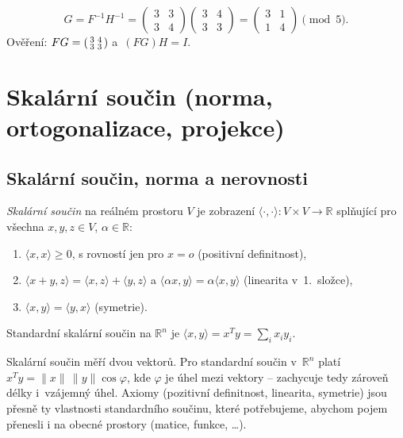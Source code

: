 \documentclass[11pt,a4paper]{article}
\begin{document}
\begin{priklad}
\begin{enumerate}[label=(\arabic*)]
    \[ G=F^{-1}H^{-1}=\begin{pmatrix}3&3\\3&4\end{pmatrix}\begin{pmatrix}3&4\\3&3\end{pmatrix}=\begin{pmatrix}3&1\\1&4\end{pmatrix}\pmod 5. \]
    Ověření: $FG=\begin{psmallmatrix}3&4\\3&3\end{psmallmatrix}$ a~$(FG)H=I$.
\end{enumerate}
\end{priklad}

\section{Skalární součin (norma, ortogonalizace, projekce)}

\subsection{Skalární součin, norma a nerovnosti}

\begin{definice}
\emph{Skalární součin} na reálném prostoru $V$ je zobrazení $\langle\cdot,\cdot\rangle:V\times V\to\mathbb{R}$ splňující pro všechna $x,y,z\in V$, $\alpha\in\mathbb{R}$:
\begin{enumerate}[label=(\arabic*)]
  \item $\langle x,x\rangle\ge0$, s rovností jen pro $x=o$ (positivní definitnost),
  \item $\langle x+y,z\rangle=\langle x,z\rangle+\langle y,z\rangle$ a $\langle\alpha x,y\rangle=\alpha\langle x,y\rangle$ (linearita v~1.\ složce),
  \item $\langle x,y\rangle=\langle y,x\rangle$ (symetrie).
\end{enumerate}
Standardní skalární součin na $\mathbb{R}^n$ je $\langle x,y\rangle=x^Ty=\sum_i x_iy_i$.
\end{definice}

\begin{intuice}
Skalární součin měří  dvou vektorů. Pro standardní součin v~$\mathbb{R}^n$ platí $x^Ty=\|x\|\,\|y\|\cos\varphi$, kde $\varphi$ je úhel mezi vektory -- zachycuje tedy zároveň délky i~vzájemný úhel. Axiomy (pozitivní definitnost, linearita, symetrie) jsou přesně ty vlastnosti standardního součinu, které potřebujeme, abychom pojem přenesli i na obecné prostory (matice, funkce, \dots).
\end{intuice}
\end{document}
